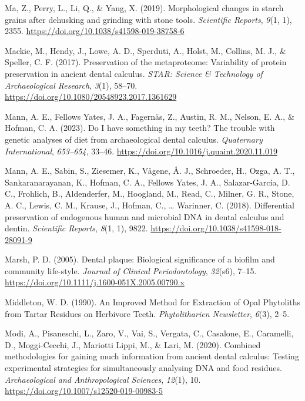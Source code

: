 \documentclass[
  letterpaper,
]{book}
\newlength{\cslhangindent}
\newlength{\cslentryspacingunit} %
\newenvironment{CSLReferences}[2] %
 {%
  \setlength{\parindent}{0pt}
  \ifodd #1
  \let\oldpar\par
  \def\par{\hangindent=\cslhangindent\oldpar}
  \fi
  \setlength{\parskip}{#2\cslentryspacingunit}
 }%
 {}
\begin{document}
\begin{CSLReferences}{1}{0}
\leavevmode{}%
Ma, Z., Perry, L., Li, Q., \& Yang, X. (2019). Morphological changes in
starch grains after dehusking and grinding with stone tools.
\emph{Scientific Reports}, \emph{9}(1, 1), 2355.
\url{https://doi.org/10.1038/s41598-019-38758-6}

\leavevmode{}%
Mackie, M., Hendy, J., Lowe, A. D., Sperduti, A., Holst, M., Collins, M.
J., \& Speller, C. F. (2017). Preservation of the metaproteome:
Variability of protein preservation in ancient dental calculus.
\emph{STAR: Science \& Technology of Archaeological Research},
\emph{3}(1), 58--70. \url{https://doi.org/10.1080/20548923.2017.1361629}

\leavevmode{}%
Mann, A. E., Fellows Yates, J. A., Fagernäs, Z., Austin, R. M., Nelson,
E. A., \& Hofman, C. A. (2023). Do {I} have something in my teeth? {The}
trouble with genetic analyses of diet from archaeological dental
calculus. \emph{Quaternary International}, \emph{653--654}, 33--46.
\url{https://doi.org/10.1016/j.quaint.2020.11.019}

\leavevmode{}%
Mann, A. E., Sabin, S., Ziesemer, K., Vågene, Å. J., Schroeder, H.,
Ozga, A. T., Sankaranarayanan, K., Hofman, C. A., Fellows Yates, J. A.,
Salazar-García, D. C., Frohlich, B., Aldenderfer, M., Hoogland, M.,
Read, C., Milner, G. R., Stone, A. C., Lewis, C. M., Krause, J., Hofman,
C., \ldots{} Warinner, C. (2018). Differential preservation of
endogenous human and microbial {DNA} in dental calculus and dentin.
\emph{Scientific Reports}, \emph{8}(1, 1), 9822.
\url{https://doi.org/10.1038/s41598-018-28091-9}

\leavevmode{}%
Marsh, P. D. (2005). Dental plaque: Biological significance of a biofilm
and community life-style. \emph{Journal of Clinical Periodontology},
\emph{32}(s6), 7--15.
\url{https://doi.org/10.1111/j.1600-051X.2005.00790.x}

\leavevmode{}%
Middleton, W. D. (1990). An {Improved Method} for {Extraction} of {Opal
Phytoliths} from {Tartar Residues} on {Herbivore Teeth}.
\emph{Phytolitharien Newsletter}, \emph{6}(3), 2--5.

\leavevmode{}%
Modi, A., Pisaneschi, L., Zaro, V., Vai, S., Vergata, C., Casalone, E.,
Caramelli, D., Moggi-Cecchi, J., Mariotti Lippi, M., \& Lari, M. (2020).
Combined methodologies for gaining much information from ancient dental
calculus: Testing experimental strategies for simultaneously analysing
{DNA} and food residues. \emph{Archaeological and Anthropological
Sciences}, \emph{12}(1), 10.
\url{https://doi.org/10.1007/s12520-019-00983-5}


\end{CSLReferences}
\end{document}
